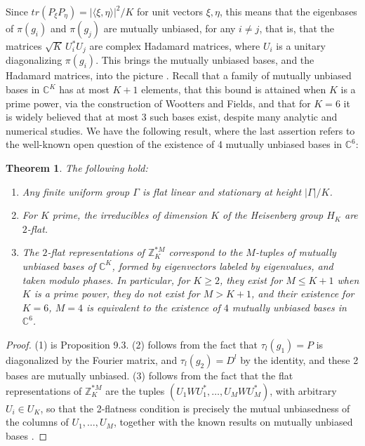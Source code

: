\documentclass[12pt]{amsart}
\newtheorem{theorem}{Theorem}[section]
\theoremstyle{definition}
\begin{document}
Since $tr(P_\xi P_\eta)=|\langle\xi,\eta\rangle|^2/K$ for unit vectors $\xi,\eta$, this means that the eigenbases of $\pi(g_i)$ and $\pi(g_j)$ are mutually unbiased, for any $i\neq j$, that is, that the matrices $\sqrt{K}\,U_i^*U_j$ are complex Hadamard matrices, where $U_i$ is a unitary diagonalizing $\pi(g_i)$. This brings the mutually unbiased bases, and the Hadamard matrices, into the picture \cite{dur,wfi}. Recall that a family of mutually unbiased bases in $\mathbb C^K$ has at most $K+1$ elements, that this bound is attained when $K$ is a prime power, via the construction of Wootters and Fields, and that for $K=6$ it is widely believed that at most 3 such bases exist, despite many analytic and numerical studies. We have the following result, where the last assertion refers to the well-known open question of the existence of 4 mutually unbiased bases in $\mathbb C^6$:

\begin{theorem}
The following hold:
\begin{enumerate}
\item Any finite uniform group $\Gamma$ is flat linear and stationary at height $|\Gamma|/K$.

\item For $K$ prime, the irreducibles of dimension $K$ of the Heisenberg group $H_K$ are $2$-flat.

\item The $2$-flat representations of $\mathbb Z_K^{*M}$ correspond to the $M$-tuples of mutually unbiased bases of $\mathbb C^K$, formed by eigenvectors labeled by eigenvalues, and taken modulo phases. In particular, for $K\geq2$, they exist for $M\leq K+1$ when $K$ is a prime power, they do not exist for $M>K+1$, and their existence for $K=6$, $M=4$ is equivalent to the existence of $4$ mutually unbiased bases in $\mathbb C^6$.
\end{enumerate}
\end{theorem}

\begin{proof}
(1) is Proposition 9.3. (2) follows from the fact that $\tau_l(g_1)=P$ is diagonalized by the Fourier matrix, and $\tau_l(g_2)=D^l$ by the identity, and these 2 bases are mutually unbiased. (3) follows from the fact that the flat representations of $\mathbb Z_K^{*M}$ are the tuples $(U_1WU_1^*,\ldots,U_MWU_M^*)$, with arbitrary $U_i\in U_K$, so that the 2-flatness condition is precisely the mutual unbiasedness of the columns of $U_1,\ldots,U_M$, together with the known results on mutually unbiased bases \cite{dur,wfi}.
\end{proof}
\end{document}
